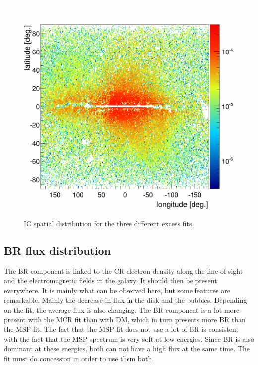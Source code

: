 \begin{figure}[h]
\begin{minipage}[h]{0.3\textwidth}
	  \label{}
  \end{minipage}
  \hfill
  \begin{minipage}[h]{0.3\textwidth}
	  \centering
	  \includegraphics[width=1.\linewidth]{pic/discussion/MSPonly_fine_IC_integral_distribution.png}
	  \label{}
  \end{minipage}
  \caption{IC spatial distribution for the three different excess fits.}
  \label{fig:IC_flux_distrib_excess_comp}	 
\end{figure}


\subsection{BR flux distribution}
The BR component is linked to the CR electron density along the line of sight and the electromagnetic fields in the galaxy. It should then be present everywhere. It is mainly what can be observed here, but some features are remarkable. Mainly the decrease in flux in the disk and the bubbles.
Depending on the fit, the average flux is also changing. The BR component is a lot more present with the MCR fit than with DM, which in turn presents more BR than the MSP fit. The fact that the MSP fit does not use a lot of BR is consistent with the fact that the MSP spectrum is very soft at low energies. Since BR is also dominant at these energies, both can not have a high flux at the same time. The fit must do concession in order to use them both.

